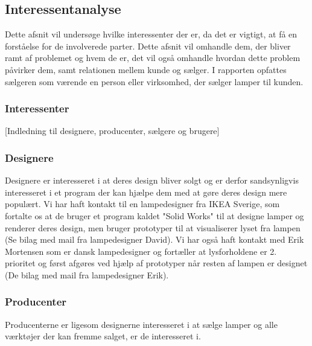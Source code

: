 \subsection{Interessentanalyse}
Dette afsnit vil undersøge hvilke interessenter der er, da det er vigtigt, at få en forståelse for de involverede parter. Dette afsnit vil omhandle dem, der bliver ramt af problemet og hvem de er, det vil også omhandle hvordan dette problem påvirker dem, samt relationen mellem kunde og sælger. I rapporten opfattes sælgeren som værende en person eller virksomhed, der sælger lamper til kunden. 

\subsubsection{Interessenter}


[Indledning til designere, producenter, sælgere og brugere]


\subsubsection{Designere}
Designere er interesseret i at deres design bliver solgt og er derfor sandsynligvis interesseret i et program der kan hjælpe dem med at gøre deres design mere populært.
Vi har haft kontakt til en lampedesigner fra IKEA Sverige, som fortalte os at de bruger et program kaldet "Solid Works"\cite{SolidWorks} til at designe lamper og renderer deres design, men bruger prototyper til at visualiserer lyset fra lampen (Se bilag med mail fra lampedesigner David).
Vi har også haft kontakt med Erik Mortensen som er dansk lampedesigner og fortæller at lysforholdene er 2. prioritet og først afgøres ved hjælp af prototyper når resten af lampen er designet (De bilag med mail fra lampedesigner Erik).

\subsubsection{Producenter}
Producenterne er ligesom designerne interesseret i at sælge lamper og alle værktøjer der kan fremme salget, er de interesseret i.

